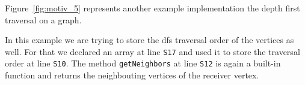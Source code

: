\begin{example} {\rm
  Figure~\ref{fig:motiv_5} represents another example implementation
    the depth first traversal on a graph. 
    
  In this example we are trying to store the dfs traversal order of the vertices 
    as well. For that we declared an array at line {\tt S17} and used it to 
    store the traversal order at line {\tt S10}. The method {\tt getNeighbors} 
  at line {\tt S12} is again a built-in function and returns the neighbouting 
    vertices of the receiver vertex. 
    \hfill\psframebox{}}
\end{example}
